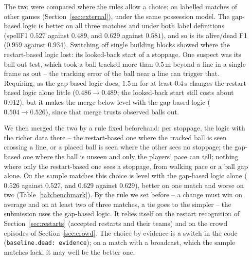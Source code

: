 \documentclass[11pt,a4paper]{article}
\begin{document}
\noindent
The two were compared where the rules allow a choice: on labelled matches of other games
(Section~\ref{sec:external}), under the same possession model. The gap-based logic is better on
all three matches and under both label definitions (spellF1 $0.527$ against $0.489$, and $0.629$
against $0.581$), and so is its alive/dead F1 ($0.959$ against $0.934$). Switching off single
building blocks showed where the restart-based logic lost: its looked-back start of a stoppage.
One suspect was its ball-out test, which took a ball tracked more than $0.5$\,m beyond a line in a
single frame as out -- the tracking error of the ball near a line can trigger that.
Requiring, as the gap-based logic does, $1.5$\,m for at least $0.4$\,s changes the
restart-based logic alone little ($0.486\to0.489$; the looked-back start still costs about
$0.012$), but it makes the merge below level with the gap-based logic ($0.504\to0.526$), since
that merge trusts observed balls out.

We then merged the two by a rule fixed beforehand: per stoppage, the logic with the richer data
there -- the restart-based one where the tracked ball is seen crossing a line, or a placed ball is
seen where the other sees no stoppage; the gap-based one where the ball is unseen and only the
players' pace can tell; nothing where only the restart-based one sees a stoppage, from walking
pace or a ball gap alone. On the sample matches this choice is level with the gap-based logic alone ($0.526$
against $0.527$, and $0.629$ against $0.629$), better on one match and worse on two
(Table~\ref{tab:benchmark}). By the rule we set before -- a change must win on average and on at
least two of three matches, a tie goes to the simpler -- the submission uses the gap-based logic.
It relies itself on the restart recognition of Section~\ref{sec:restarts} (accepted restarts and
their teams) and on the crowd episodes of Section~\ref{sec:crowd}. The choice by evidence is a
switch in the code (\texttt{baseline.dead: evidence}); on a match with a broadcast, which the
sample matches lack, it may well be the better one.
\end{document}
